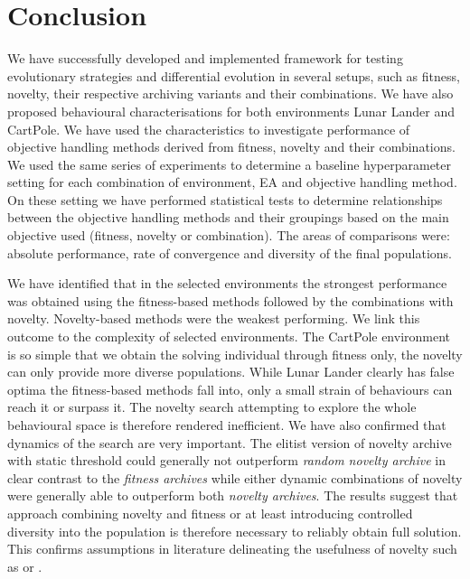 \chapter*{Conclusion}


We have successfully developed and implemented framework for testing evolutionary strategies and differential evolution in several setups, such as fitness, novelty, their respective archiving variants and their combinations. We have also proposed behavioural characterisations for both environments Lunar Lander and CartPole. 
We have used the characteristics to investigate performance of objective handling methods derived from fitness, novelty and their combinations. We used the same series of experiments to determine a baseline hyperparameter setting for each combination of environment, EA and objective handling method. On these setting we have performed statistical tests to determine relationships between the objective handling methods and their groupings based on the main objective used (fitness, novelty or combination).    
The areas of comparisons were: absolute performance, rate of convergence and diversity of the final populations.

We have identified that in the selected environments the strongest performance was obtained using the fitness-based methods followed by the combinations with novelty. Novelty-based methods were the weakest performing. We link this outcome to the complexity of selected environments. The CartPole environment is so simple that we obtain the solving individual through fitness only, the novelty can only provide more diverse populations. While Lunar Lander clearly has false optima the fitness-based methods fall into, only a small strain of behaviours can reach it or surpass it. The novelty search attempting to explore the whole behavioural space is therefore rendered inefficient. 
We have also confirmed that dynamics of the search are very important. The elitist version of novelty archive with static threshold could generally not outperform \textit{random novelty archive} in clear contrast to the \textit{fitness archives} while either dynamic combinations of novelty were generally able to outperform both \textit{novelty archives}. 
The results suggest that approach combining novelty and fitness or at least introducing controlled diversity into the population is therefore necessary to reliably obtain full solution. This confirms assumptions in literature delineating the usefulness of novelty such as  \cite{noveltyarticle} or \cite{notenoughnovelty}.


